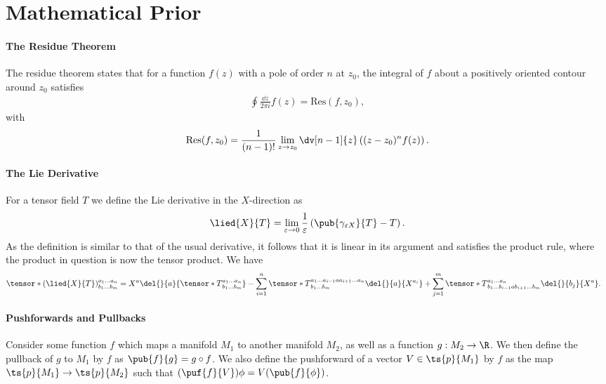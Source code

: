 \section{Mathematical Prior}

\paragraph{The Residue Theorem}
The residue theorem states that for a function $f(z)$ with a pole of order $n$ at $z_{0}$, the integral of $f$ about a positively oriented contour around $z_{0}$ satisfies
\begin{align*}
	\oint\frac{\dd{z}}{2\pi i}f(z) = \text{Res}(f, z_{0}),
\end{align*}
with
\begin{align*}
	\text{Res}(f, z_{0}) = \frac{1}{(n - 1)!}\lim\limits_{z\to z_{0}}\dv[n - 1]{z}\left((z - z_{0})^{n}f(z)\right).
\end{align*}

\paragraph{The Lie Derivative}
For a tensor field $T$ we define the Lie derivative in the $X$-direction as
\begin{align*}
	\lied{X}{T} = \lim\limits_{\varepsilon\to 0}\frac{1}{\varepsilon}\left(\pub{\gamma_{\varepsilon X}}{T} - T\right).
\end{align*}
As the definition is similar to that of the usual derivative, it follows that it is linear in its argument and satisfies the product rule, where the product in question is now the tensor product. We have
\begin{align*}
	\tensor*{(\lied{X}{T})}{^{a_{1}\dots a_{n}}_{b_{1}\dots b_{m}}} &= X^{a}\del{}{a}{\tensor*{T}{^{a_{1}\dots a_{n}}_{b_{1}\dots b_{m}}}} - \sum\limits_{i = 1}^{n}\tensor*{T}{^{a_{1}\dots a_{i - 1}aa_{i + 1}\dots a_{n}}_{b_{1}\dots b_{m}}}\del{}{a}{X^{a_{i}}} + \sum\limits_{j = 1}^{m}\tensor*{T}{^{a_{1}\dots a_{n}}_{b_{1}\dots b_{i - 1}ab_{i + 1}\dots b_{m}}}\del{}{b_{j}}{X^{a}}.
\end{align*}

\paragraph{Pushforwards and Pullbacks}
Consider some function $f$ which maps a manifold $M_{1}$ to another manifold $M_{2}$, as well as a function $g: M_{2}\to\R$. We then define the pullback of $g$ to $M_{1}$ by $f$ as $\pub{f}{g} = g\circ f$. We also define the pushforward of a vector $V\in\ts{p}{M_{1}}$ by $f$ as the map $\ts{p}{M_{1}}\to\ts{p}{M_{2}}$ such that $(\puf{f}{V})\phi = V(\pub{f}{\phi})$.


